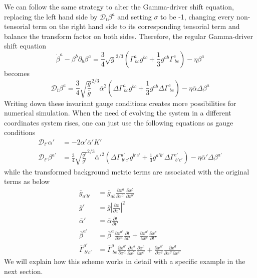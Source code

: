 \documentclass[letterpaper,nofootinbib,prd,amsmath,onecolumn]{revtex4-1}
\begin{document}
We can follow the same strategy to alter the Gamma-driver shift equation, replacing the left hand side by $\mathscr{D}_{t}\beta^{a}$ and setting $\sigma$ to be -1, changing every non-tensorial term on the right hand side to its corresponding tensorial term and balance the transform factor on both sides. Therefore, the regular Gamma-driver shift equation
\begin{equation}
{\dot \beta}^{a} - \beta^{b}\partial_{b}\beta^{a} = \frac{3}{4}\sqrt{g}^{2/3}(\Gamma^{a}_{~bc}g^{bc} + \frac{1}{3}g^{ab}\Gamma^{c}_{~bc}) - \eta \beta^{a} 
\end{equation}
becomes
\begin{equation}\label{invariant Gamma-driver shift}
\mathscr{D}_{t}\beta^{a} = \frac{3}{4}\sqrt{\frac{g}{{\bar g}}}^{2/3}{\bar \alpha}^{2}(\Delta \Gamma^{a}_{~bc}g^{bc} + \frac{1}{3}g^{ab}\Delta\Gamma^{c}_{~bc}) - \eta {\bar \alpha}\Delta\beta^{a}
\end{equation}
Writing down these invariant gauge conditions creates more possibilities for numerical simulation. When the need of evolving the system in a different coordinates system rises, one can just use the following equations as gauge conditions
\begin{align*}
\mathscr{D}_{t'}\alpha' & = -2\alpha'{\bar \alpha}'K'\\
\mathscr{D}_{t'}\beta^{a'} & = \frac{3}{4}\sqrt{\frac{g'}{{\bar g}'}}^{2/3}{\bar \alpha}'^{2}(\Delta \Gamma^{a'}_{~b'c'}g^{b'c'} + \frac{1}{3}g^{a'b'}\Delta\Gamma^{c'}_{~b'c'}) - \eta {\bar \alpha}'\Delta\beta^{a'}
\end{align*}
while the transformed background metric terms are associated with the original terms as below
\begin{align}
{\bar g}_{a'b'} & = {\bar g}_{ab}\frac{\partial x^{a}}{\partial x^{a'}}\frac{\partial x^{b}}{\partial x^{b'}}\\
{\bar g'} & = {\bar g}|\frac{\partial x}{\partial x'}|^{2}\\
{\bar \alpha}' & = {\bar \alpha}\frac{\partial t}{\partial t'}\\
{\bar \beta}^{a'} & = {\bar \beta}^{a}\frac{\partial x^{a'}}{\partial x^{a}}\frac{\partial t}{\partial t'} + \frac{\partial x^{a'}}{\partial x^{c}}\frac{\partial x^{c}}{\partial t'}\label{background shift}\\
{\bar \Gamma}^{a'}_{~b'c'} & = {\bar \Gamma}^{a}_{~bc}\frac{\partial x^{a'}}{\partial x^{a}}\frac{\partial x^{b}}{\partial x^{b'}}\frac{\partial x^{c}}{\partial x^{c'}} + \frac{\partial x^{a'}}{\partial x^{d}}\frac{\partial x^{d}}{\partial x^{b'}\partial x^{c'}}
\end{align}
We will explain how this scheme works in detail with a specific example in the next section. 
\end{document}
